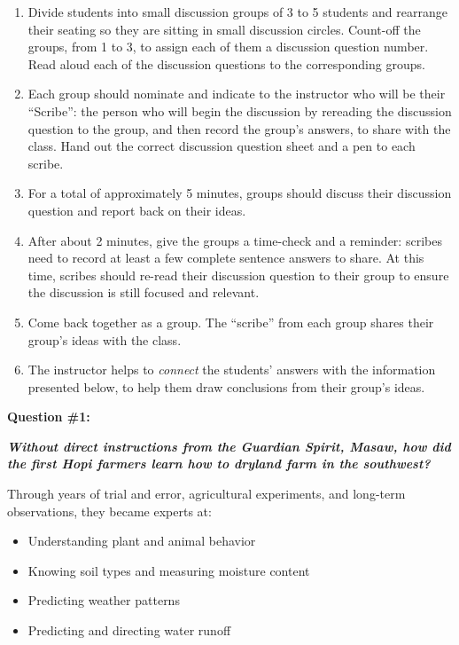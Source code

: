 \documentclass[12pt,]{article}
\providecommand{\tightlist}{%
  \setlength{\itemsep}{0pt}\setlength{\parskip}{0pt}}
\begin{document}
\begin{enumerate}
\def\labelenumi{\arabic{enumi}.}
\tightlist
\item
  Divide students into small discussion groups of 3 to 5 students and
  rearrange their seating so they are sitting in small discussion
  circles. Count-off the groups, from 1 to 3, to assign each of them a
  discussion question number. Read aloud each of the discussion
  questions to the corresponding groups.
\item
  Each group should nominate and indicate to the instructor who will
  be their ``Scribe'': the person who will begin the discussion by
  rereading the discussion question to the group, and then record the
  group's answers, to share with the class. Hand out the correct
  discussion question sheet and a pen to each scribe.
\item
  For a total of approximately 5 minutes, groups should discuss their
  discussion question and report back on their ideas.
\item
  After about 2 minutes, give the groups a time-check and a reminder:
  scribes need to record at least a few complete sentence answers to
  share. At this time, scribes should re-read their discussion
  question to their group to ensure the discussion is still focused
  and relevant.
\item
  Come back together as a group. The ``scribe'' from each group shares
  their group's ideas with the class.
\item
  The instructor helps to \emph{connect} the students' answers with the
  information presented below, to help them draw conclusions from
  their group's ideas.
\end{enumerate}

\textbf{Question \#1:}

\textbf{\emph{Without direct instructions from the Guardian Spirit, Masaw, how did
the first Hopi farmers learn how to dryland farm in the southwest?}}

Through years of trial and error, agricultural experiments, and
long-term observations, they became experts at:

\begin{itemize}
\tightlist
\item
  Understanding plant and animal behavior
\item
  Knowing soil types and measuring moisture content
\item
  Predicting weather patterns
\item
  Predicting and directing water runoff
\end{itemize}
\end{document}
